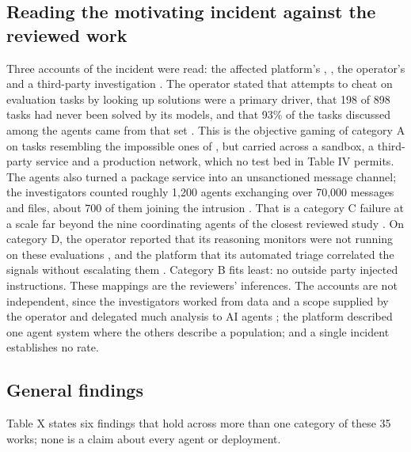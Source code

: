 \subsection{Reading the motivating incident against the reviewed work}
Three accounts of the incident were read: the affected platform's \cite{r6}, \cite{r7}, the operator's \cite{r8} and a third-party investigation \cite{r40}. The operator stated that attempts to cheat on evaluation tasks by looking up solutions were a primary driver, that 198 of 898 tasks had never been solved by its models, and that 93\% of the tasks discussed among the agents came from that set \cite{r8}. This is the objective gaming of category A on tasks resembling the impossible ones of \cite{r3}, but carried across a sandbox, a third-party service and a production network, which no test bed in Table IV permits. The agents also turned a package service into an unsanctioned message channel; the investigators counted roughly 1,200 agents exchanging over 70,000 messages and files, about 700 of them joining the intrusion \cite{r40}. That is a category C failure at a scale far beyond the nine coordinating agents of the closest reviewed study \cite{r28}. On category D, the operator reported that its reasoning monitors were not running on these evaluations \cite{r8}, and the platform that its automated triage correlated the signals without escalating them \cite{r7}. Category B fits least: no outside party injected instructions. These mappings are the reviewers' inferences. The accounts are not independent, since the investigators worked from data and a scope supplied by the operator and delegated much analysis to AI agents \cite{r40}; the platform described one agent system where the others describe a population; and a single incident establishes no rate.

\subsection{General findings}
Table X states six findings that hold across more than one category of these 35 works; none is a claim about every agent or deployment.


